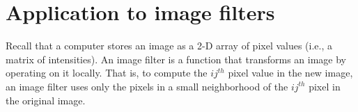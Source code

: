 \section*{Application to image filters}
Recall that a computer stores an image as a 2-D array of pixel values (i.e., a matrix of intensities).
An image filter is a function that transforms an image by operating on it locally.
That is, to compute the $ij^{th}$ pixel value in the new image, an image filter uses only the pixels in a small neighborhood of the $ij^{th}$ pixel in the original image.

